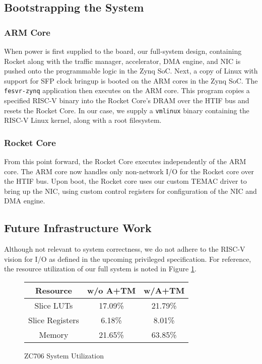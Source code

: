 \subsection{Bootstrapping the System}
    \subsubsection{ARM Core}

    When power is first supplied to the board, our full-system design, containing
    Rocket along with the traffic manager, accelerator, DMA engine, and NIC is 
    pushed onto the programmable logic in the Zynq SoC. Next, a copy of Linux
    with support for SFP clock bringup is booted on the ARM cores in the Zynq
    SoC. The \texttt{fesvr-zynq} application then executes on the ARM core. 
    This program copies a specified RISC-V binary into the Rocket Core's DRAM 
    over the HTIF bus and resets the Rocket Core. In our case, we supply a 
    \texttt{vmlinux} binary containing the RISC-V Linux kernel, along with a 
    root filesystem.

    \subsubsection{Rocket Core}

    From this point forward, the Rocket Core executes independently of the ARM 
    core. The ARM core now handles only non-network I/O for the Rocket core over
    the HTIF bus. Upon boot, the Rocket core uses our custom TEMAC driver to 
    bring up the NIC, using custom control registers for configuration of the
    NIC and DMA engine.


\subsection{Future Infrastructure Work}
    Although not relevant to system correctness, we do not adhere to the RISC-V
    vision for I/O as defined in the upcoming privileged 
    specification. For reference, the resource utilization of our full system 
    is noted in Figure \ref{fig:utiltab}.
    

\begin{figure}[t]
\begin{center}
\begin{tabular}{ | c | c | c |  } \hline
    Resource        & w/o A+TM & w/A+TM  \\ \hline
    Slice LUTs      & 17.09\%   &  21.79\%   \\  \hline
    Slice Registers & 6.18\%    &  8.01\%    \\  \hline
    Memory          & 21.65\%   &  63.85\%   \\  \hline
\end{tabular}
\caption{ZC706 System Utilization}
\label{fig:utiltab}
\end{center}
\end{figure}




